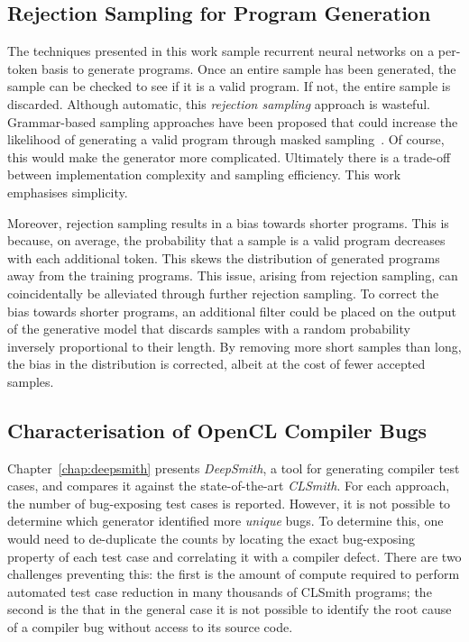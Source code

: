 \subsection{Rejection Sampling for Program Generation}

The techniques presented in this work sample recurrent neural networks on a per-token basis to generate programs. Once an entire sample has been generated, the sample can be checked to see if it is a valid program. If not, the entire sample is discarded. Although automatic, this \emph{rejection sampling} approach is wasteful. Grammar-based sampling approaches have been proposed that could increase the likelihood of generating a valid program through masked sampling~\cite{Dyer2016}. Of course, this would make the generator more complicated. Ultimately there is a trade-off between implementation complexity and sampling efficiency. This work emphasises simplicity.

Moreover, rejection sampling results in a bias towards shorter programs. This is because, on average, the probability that a sample is a valid program decreases with each additional token. This skews the distribution of generated programs away from the training programs. This issue, arising from rejection sampling, can coincidentally be alleviated through further rejection sampling. To correct the bias towards shorter programs, an additional filter could be placed on the output of the generative model that discards samples with a random probability inversely proportional to their length. By removing more short samples than long, the bias in the distribution is corrected, albeit at the cost of fewer accepted samples.


\subsection{Characterisation of OpenCL Compiler Bugs}

Chapter~\ref{chap:deepsmith} presents \emph{DeepSmith}, a tool for generating compiler test cases, and compares it against the state-of-the-art \emph{CLSmith}. For each approach, the number of bug-exposing test cases is reported. However, it is not possible to determine which generator identified more \emph{unique} bugs. To determine this, one would need to de-duplicate the counts by locating the exact bug-exposing property of each test case and correlating it with a compiler defect. There are two challenges preventing this: the first is the amount of compute required to perform automated test case reduction in many thousands of CLSmith programs; the second is the that in the general case it is not possible to identify the root cause of a compiler bug without access to its source code.

